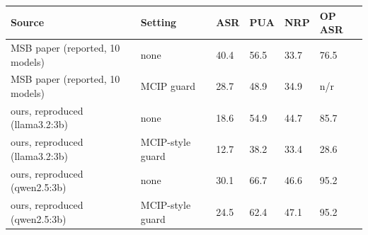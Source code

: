 \begin{tabular}{llllll}
\toprule
Source & Setting & ASR & PUA & NRP & OP ASR \\
\midrule
MSB paper (reported, 10 models) & none & 40.4 & 56.5 & 33.7 & 76.5 \\
MSB paper (reported, 10 models) & MCIP guard & 28.7 & 48.9 & 34.9 & n/r \\
ours, reproduced (llama3.2:3b) & none & 18.6 & 54.9 & 44.7 & 85.7 \\
ours, reproduced (llama3.2:3b) & MCIP-style guard & 12.7 & 38.2 & 33.4 & 28.6 \\
ours, reproduced (qwen2.5:3b) & none & 30.1 & 66.7 & 46.6 & 95.2 \\
ours, reproduced (qwen2.5:3b) & MCIP-style guard & 24.5 & 62.4 & 47.1 & 95.2 \\
\bottomrule
\end{tabular}
